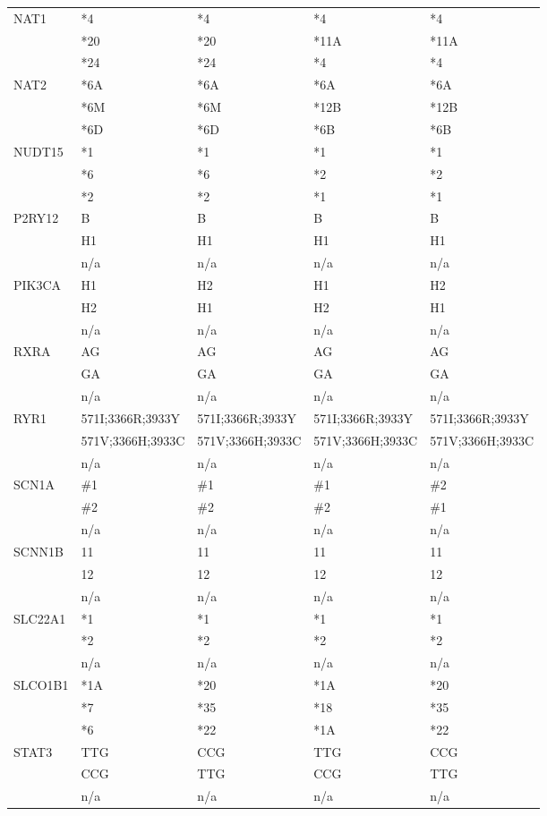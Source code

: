 \documentclass{report}
\begin{document}
\begin{tabularx}{\textwidth}{ X | XXXX }
\midrule
NAT1
& *4 & *4 & *4 & *4 \\
& *20 & *20 & *11A & *11A  \\
& *24 & *24 & *4 & *4 \\
\midrule
NAT2
& *6A & *6A & *6A & *6A \\
& *6M & *6M & *12B & *12B  \\
& *6D & *6D & *6B & *6B \\
\midrule
NUDT15
& *1 & *1 & *1 & *1 \\
& *6 & *6 & *2 & *2  \\
& *2 & *2 & *1 & *1 \\
\midrule
P2RY12
& B & B & B & B \\
& H1 & H1 & H1 & H1  \\
& n/a & n/a & n/a & n/a \\
\midrule
PIK3CA
& H1 & H2 & H1 & H2 \\
& H2 & H1 & H2 & H1  \\
& n/a & n/a & n/a & n/a \\
\midrule
RXRA
& AG & AG & AG & AG \\
& GA & GA & GA & GA  \\
& n/a & n/a & n/a & n/a \\
\midrule
RYR1
& 571I;3366R;3933Y & 571I;3366R;3933Y & 571I;3366R;3933Y & 571I;3366R;3933Y \\
& 571V;3366H;3933C & 571V;3366H;3933C & 571V;3366H;3933C & 571V;3366H;3933C  \\
& n/a & n/a & n/a & n/a \\
\midrule
SCN1A
& \#1 & \#1 & \#1 & \#2 \\
& \#2 & \#2 & \#2 & \#1  \\
& n/a & n/a & n/a & n/a \\
\midrule
SCNN1B
& 11 & 11 & 11 & 11 \\
& 12 & 12 & 12 & 12  \\
& n/a & n/a & n/a & n/a \\
\midrule
SLC22A1
& *1 & *1 & *1 & *1 \\
& *2 & *2 & *2 & *2  \\
& n/a & n/a & n/a & n/a \\
\midrule
SLCO1B1
& *1A & *20 & *1A & *20 \\
& *7 & *35 & *18 & *35  \\
& *6 & *22 & *1A & *22 \\
\midrule
STAT3
& TTG & CCG & TTG & CCG \\
& CCG & TTG & CCG & TTG  \\
& n/a & n/a & n/a & n/a \\

\end{tabularx}
\end{document}
